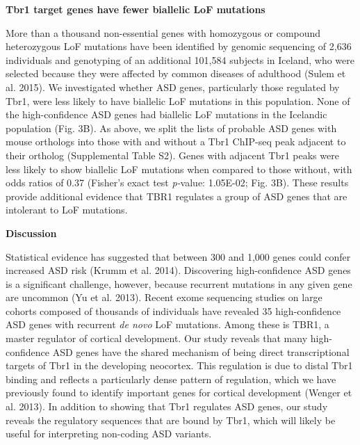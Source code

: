 \documentclass[]{article}
\begin{document}
\textbf{Tbr1 target genes have fewer biallelic LoF mutations}

More than a thousand non-essential genes with homozygous or compound
heterozygous LoF mutations have been identified by genomic sequencing of
2,636 individuals and genotyping of an additional 101,584 subjects in
Iceland, who were selected because they were affected by common diseases
of adulthood (Sulem et al. 2015). We investigated whether ASD genes,
particularly those regulated by Tbr1, were less likely to have biallelic
LoF mutations in this population. None of the high-confidence ASD genes
had biallelic LoF mutations in the Icelandic population (Fig. 3B). As
above, we split the lists of probable ASD genes with mouse orthologs
into those with and without a Tbr1 ChIP-seq peak adjacent to their
ortholog (Supplemental Table S2). Genes with adjacent Tbr1 peaks were
less likely to show biallelic LoF mutations when compared to those
without, with odds ratios of 0.37 (Fisher's exact test \emph{p-}value:
1.05E-02; Fig. 3B). These results provide additional evidence that TBR1
regulates a group of ASD genes that are intolerant to LoF mutations.

\textbf{Discussion}

Statistical evidence has suggested that between 300 and 1,000 genes
could confer increased ASD risk (Krumm et al. 2014). Discovering
high-confidence ASD genes is a significant challenge, however, because
recurrent mutations in any given gene are uncommon (Yu et al. 2013).
Recent exome sequencing studies on large cohorts composed of thousands
of individuals have revealed 35 high-confidence ASD genes with recurrent
\emph{de novo} LoF mutations. Among these is TBR1, a master regulator of
cortical development. Our study reveals that many high-confidence ASD
genes have the shared mechanism of being direct transcriptional targets
of Tbr1 in the developing neocortex. This regulation is due to distal
Tbr1 binding and reflects a particularly dense pattern of regulation,
which we have previously found to identify important genes for cortical
development (Wenger et al. 2013). In addition to showing that Tbr1
regulates ASD genes, our study reveals the regulatory sequences that are
bound by Tbr1, which will likely be useful for interpreting non-coding
ASD variants.
\end{document}
